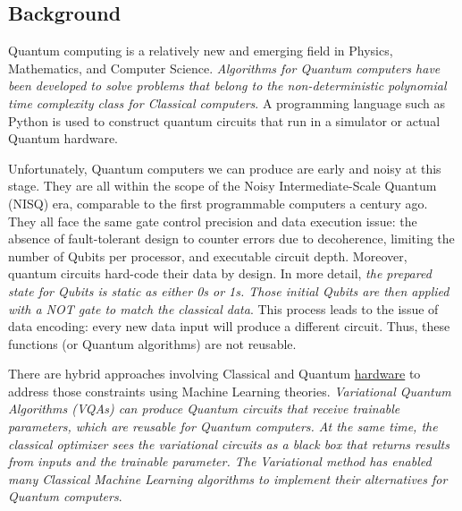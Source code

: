 \subsection{Background}\label{Background Section}
Quantum computing is a relatively new and emerging field in Physics, Mathematics, and Computer Science. 
\emph{Algorithms for Quantum computers have been developed to solve problems that belong to the non-deterministic polynomial time complexity class for Classical computers}. 
A programming language such as Python is used to construct quantum circuits that run in a simulator or actual Quantum hardware. 

Unfortunately, Quantum computers we can produce are early and noisy at this stage. 
They are all within the scope of the Noisy Intermediate-Scale Quantum (NISQ) era, comparable to the first programmable computers a century ago. 
They all face the same gate control precision and data execution issue: the absence of fault-tolerant design to counter errors due to decoherence, limiting the number of Qubits per processor, and executable circuit depth. 
Moreover, quantum circuits hard-code their data by design. In more detail, \emph{the prepared state for Qubits is static as either 0s or 1s. 
Those initial Qubits are then applied with a NOT gate to match the classical data}. This process leads to the issue of data encoding: every new data input will produce a different circuit. 
Thus, these functions (or Quantum algorithms) are not reusable.

There are hybrid approaches involving Classical and Quantum \underline{hardware} to address those constraints using Machine Learning theories. 
\emph{Variational Quantum Algorithms (VQAs) can produce Quantum circuits that receive trainable parameters, which are reusable for Quantum computers. 
At the same time, the classical optimizer sees the variational circuits as a black box that returns results from inputs and the trainable parameter. 
The Variational method has enabled many Classical Machine Learning algorithms to implement their alternatives for Quantum computers}.

